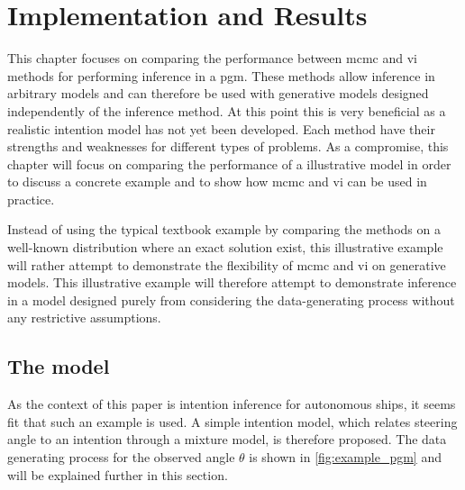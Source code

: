 \chapter{Implementation and Results}\label{chap:impl}

This chapter focuses on comparing the performance between \acrshort{mcmc} and \acrshort{vi} methods for performing inference in a \acrshort{pgm}. These methods allow inference in arbitrary models and can therefore be used with generative models designed independently of the inference method. At this point this is very beneficial as a realistic intention model has not yet been developed. Each method have their strengths and weaknesses for different types of problems. As a compromise, this chapter will focus on comparing the performance of a illustrative model in order to discuss a concrete example and to show how \acrshort{mcmc} and \acrshort{vi} can be used in practice.

Instead of using the typical textbook example by comparing the methods on a well-known distribution where an exact solution exist, this illustrative example will rather attempt to demonstrate the flexibility of \acrshort{mcmc} and \acrshort{vi} on generative models. This illustrative example will therefore attempt to demonstrate inference in a model designed purely from considering the data-generating process without any restrictive assumptions.

\section{The model}
As the context of this paper is intention inference for autonomous ships, it seems fit that such an example is used. A simple intention model, which relates steering angle to an intention through a mixture model, is therefore proposed. The data generating process for the observed angle $\theta$ is shown in \cref{fig:example_pgm} and will be explained further in this section.

